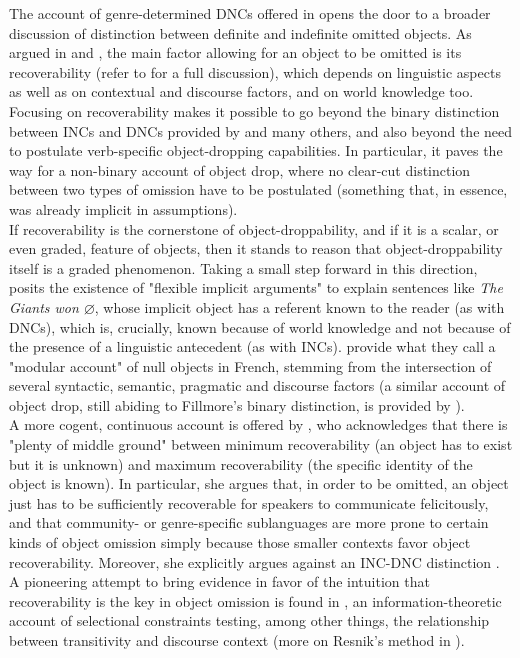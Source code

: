 The account of genre-determined DNCs offered in  opens the door to a broader discussion of  distinction between definite and indefinite omitted objects. As argued in \textcite[165]{RuppenhoferMichaelis2010} and \textcite[24]{BerghOhlander2016}, the main factor allowing for an object to be omitted is its recoverability (refer to  for a full discussion), which depends on linguistic aspects as well as on contextual and discourse factors, and on world knowledge too. Focusing on recoverability makes it possible to go beyond the binary distinction between INCs and DNCs provided by \textcite{Fillmore1986} and many others, and also beyond the need to postulate verb-specific object-dropping capabilities. In particular, it paves the way for a non-binary account of object drop, where no clear-cut distinction between two types of omission have to be postulated (something that, in essence, was already implicit in  assumptions).\\
If recoverability is the cornerstone of object-droppability, and if it is a scalar, or even graded, feature of objects, then it stands to reason that object-droppability itself is a graded phenomenon. Taking a small step forward in this direction, \textcite{AnderBois} posits the existence of "flexible implicit arguments" to explain sentences like \textit{The Giants won $\varnothing$}, whose implicit object has a referent known to the reader (as with DNCs), which is, crucially, known because of world knowledge and not because of the presence of a linguistic antecedent (as with INCs). \textcite{CumminsRoberge2005} provide what they call a "modular account" of null objects in French, stemming from the intersection of several syntactic, semantic, pragmatic and discourse factors (a similar account of object drop, still abiding to Fillmore's binary distinction, is provided by \textcite{Cennamo2017}).\\
A more cogent, continuous account is offered by \textcite{Glass2013}, who acknowledges that there is "plenty of middle ground" between minimum recoverability (an object has to exist but it is unknown) and maximum recoverability (the specific identity of the object is known). In particular, she argues that, in order to be omitted, an object just has to be sufficiently recoverable for speakers to communicate felicitously, and that community- or genre-specific sublanguages are more prone to certain kinds of object omission simply because those smaller contexts favor object recoverability. Moreover, she explicitly argues against an INC-DNC distinction \parencite[1]{Glass2013}. A pioneering attempt to bring evidence in favor of the intuition that recoverability is the key in object omission is found in \textcite{Resnik1993, Resnik1996}, an information-theoretic account of selectional constraints testing, among other things, the relationship between transitivity and discourse context (more on Resnik's method in ).\\
